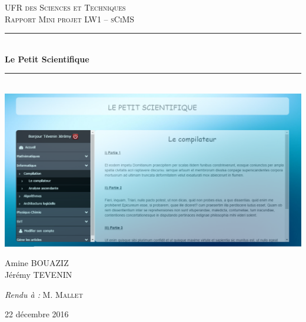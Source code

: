 \documentclass[hidelinks, 12pt,a4paper]{article}
\newcommand{\HRule}{\rule{\linewidth}{0.5mm}}
\begin{document}
\begin{titlepage}
  \begin{sffamily}
  \begin{center}


    \textsc{\LARGE UFR des Sciences et Techniques}\\[2.5cm]

    \textsc{\Large Rapport Mini projet LW1 – sCiMS}\\[1.5cm]

    \HRule \\[0.4cm]
    { \huge \bfseries Le Petit Scientifique\\[0.4cm] }

	\HRule \\[2cm]
    \includegraphics[scale=0.5]{images/accueil2.png}
    \\[2cm]

    \begin{minipage}{0.4\textwidth}
      \begin{flushleft} \large
        Amine \textsc{BOUAZIZ}\\
        Jérémy \textsc{TEVENIN}\\
      \end{flushleft}
    \end{minipage}
    \begin{minipage}{0.4\textwidth}
      \begin{flushright} \large
        \emph{Rendu à :} M. \textsc{Mallet}\\
      \end{flushright}
    \end{minipage}

    \vfill

    {\large 22 décembre 2016}

  \end{center}
  \end{sffamily}
\end{titlepage}
\end{document}
